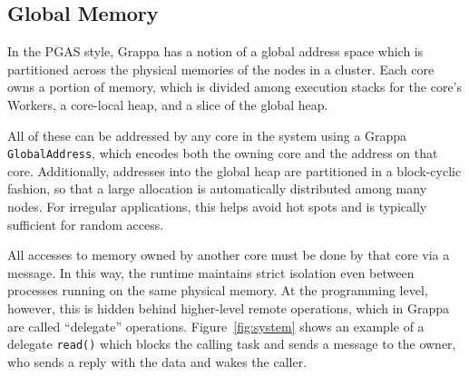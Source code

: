 \subsection{Global Memory}
In the PGAS style, Grappa has a notion of a global address space which is partitioned across the physical memories of the nodes in a cluster. Each core owns a portion of memory, which is divided among execution stacks for the core's Workers, a core-local heap, and a slice of the global heap.

All of these can be addressed by any core in the system using a Grappa \texttt{GlobalAddress}, which encodes both the owning core and the address on that core. Additionally, addresses into the global heap are partitioned in a block-cyclic fashion, so that a large allocation is automatically distributed among many nodes. For irregular applications, this helps avoid hot spots and is typically sufficient for random access.

All accesses to memory owned by another core must be done by that core via a message. In this way, the runtime maintains strict isolation even between processes running on the same physical memory. At the programming level, however, this is hidden behind higher-level remote operations, which in Grappa are called ``delegate'' operations. Figure~\ref{fig:system} shows an example of a delegate \texttt{read()} which blocks the calling task and sends a message to the owner, who sends a reply with the data and wakes the caller.

